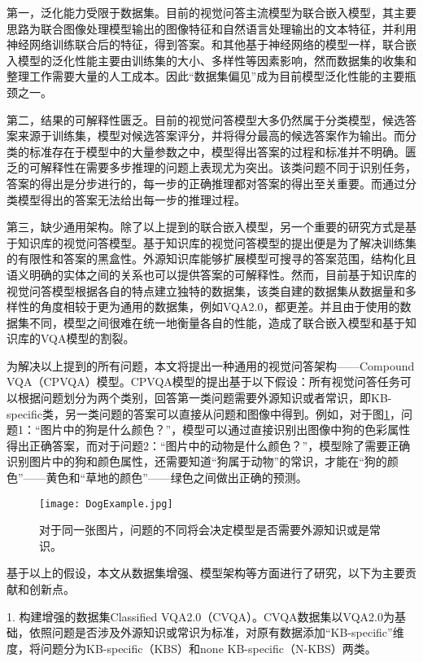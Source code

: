 第一，泛化能力受限于数据集。目前的视觉问答主流模型为联合嵌入模型，其主要思路为联合图像处理模型输出的图像特征和自然语言处理输出的文本特征，并利用神经网络训练联合后的特征，得到答案。和其他基于神经网络的模型一样，联合嵌入模型的泛化性能主要由训练集的大小、多样性等因素影响，然而数据集的收集和整理工作需要大量的人工成本。因此“数据集偏见”成为目前模型泛化性能的主要瓶颈之一。

第二，结果的可解释性匮乏。目前的视觉问答模型大多仍然属于分类模型，候选答案来源于训练集，模型对候选答案评分，并将得分最高的候选答案作为输出。而分类的标准存在于模型中的大量参数之中，模型得出答案的过程和标准并不明确。匮乏的可解释性在需要多步推理的问题上表现尤为突出。该类问题不同于识别任务，答案的得出是分步进行的，每一步的正确推理都对答案的得出至关重要。而通过分类模型得出的答案无法给出每一步的推理过程。

第三，缺少通用架构。除了以上提到的联合嵌入模型，另一个重要的研究方式是基于知识库的视觉问答模型。基于知识库的视觉问答模型的提出便是为了解决训练集的有限性和答案的黑盒性。外源知识库能够扩展模型可搜寻的答案范围，结构化且语义明确的实体之间的关系也可以提供答案的可解释性。然而，目前基于知识库的视觉问答模型根据各自的特点建立独特的数据集，该类自建的数据集从数据量和多样性的角度相较于更为通用的数据集，例如VQA2.0，都更差。并且由于使用的数据集不同，模型之间很难在统一地衡量各自的性能，造成了联合嵌入模型和基于知识库的VQA模型的割裂。

为解决以上提到的所有问题，本文将提出一种通用的视觉问答架构——Compound VQA（CPVQA）模型。CPVQA模型的提出基于以下假设：所有视觉问答任务可以根据问题划分为两个类别，回答第一类问题需要外源知识或者常识，即KB-specific类，另一类问题的答案可以直接从问题和图像中得到。例如，对于图\ref{DogExample}，问题1：“图片中的狗是什么颜色？”，模型可以通过直接识别出图像中狗的色彩属性得出正确答案，而对于问题2：“图片中的动物是什么颜色？”，模型除了需要正确识别图片中的狗和颜色属性，还需要知道“狗属于动物”的常识，才能在“狗的颜色”——黄色和“草地的颜色”——绿色之间做出正确的预测。

\begin{figure}[H]
	\texttt{[image: DogExample.jpg]}
	\caption{对于同一张图片，问题的不同将会决定模型是否需要外源知识或是常识。}
	\label{DogExample}
\end{figure}

基于以上的假设，本文从数据集增强、模型架构等方面进行了研究，以下为主要贡献和创新点。

1. 构建增强的数据集Classified VQA2.0（CVQA）。CVQA数据集以VQA2.0为基础，依照问题是否涉及外源知识或常识为标准，对原有数据添加“KB-specific”维度，将问题分为KB-specific（KBS）和none KB-specific（N-KBS）两类。

